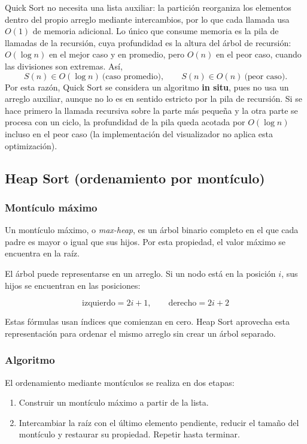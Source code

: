 \documentclass[11pt,letterpaper]{article}
\begin{document}
Quick Sort no necesita una lista auxiliar: la partición reorganiza los elementos dentro del propio arreglo mediante intercambios, por lo que cada llamada usa $O(1)$ de memoria adicional. Lo único que consume memoria es la pila de llamadas de la recursión, cuya profundidad es la altura del árbol de recursión: $O(\log n)$ en el mejor caso y en promedio, pero $O(n)$ en el peor caso, cuando las divisiones son extremas. Así,
\[
  S(n) \in O(\log n) \ \text{(caso promedio)}, \qquad S(n) \in O(n) \ \text{(peor caso)}.
\]
Por esta razón, Quick Sort se considera un algoritmo \textbf{in situ}, pues no usa un arreglo auxiliar, aunque no lo es en sentido estricto por la pila de recursión. Si se hace primero la llamada recursiva sobre la parte más pequeña y la otra parte se procesa con un ciclo, la profundidad de la pila queda acotada por $O(\log n)$ incluso en el peor caso (la implementación del visualizador no aplica esta optimización).

\subsection{Heap Sort (ordenamiento por montículo)}

\subsubsection{Montículo máximo}

Un montículo máximo, o \textit{max-heap}, es un árbol binario completo en el que cada padre es mayor o igual que sus hijos. Por esta propiedad, el valor máximo se encuentra en la raíz.

El árbol puede representarse en un arreglo. Si un nodo está en la posición \(i\), sus hijos se encuentran en las posiciones:

\[
\text{izquierdo}=2i+1, \qquad
\text{derecho}=2i+2
\]

Estas fórmulas usan índices que comienzan en cero. Heap Sort aprovecha esta representación para ordenar el mismo arreglo sin crear un árbol separado.

\subsubsection{Algoritmo}

El ordenamiento mediante montículos se realiza en dos etapas:

\begin{enumerate}
    \item Construir un montículo máximo a partir de la lista.
    \item Intercambiar la raíz con el último elemento pendiente, reducir el tamaño del montículo y restaurar su propiedad. Repetir hasta terminar.
\end{enumerate}
\end{document}
